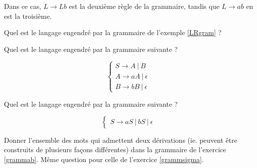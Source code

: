 Dans ce cas, $L \rightarrow Lb$ est la deuxième règle de la grammaire, tandis que $L \rightarrow ab$ en est la troisième.


\begin{exercice}
Quel est le langage engendré par la grammaire de l'exemple \ref{LRgram} ?
\end{exercice}

\begin{exercice}
\label{grammab}
Quel est le langage engendré par la grammaire suivante ?

\[
\begin{cases}
S \rightarrow A~|~B \\
A \rightarrow aA~|~\epsilon \\
B \rightarrow bB~|~\epsilon
\end{cases}
\]

\end{exercice}

\begin{exercice}
\label{grammsigma}
Quel est le langage engendré par la grammaire suivante ?

\[
\begin{cases}
S \rightarrow aS~|~bS~|~\epsilon 
\end{cases}
\]

\end{exercice}

\begin{exercice}
Donner l'ensemble des mots qui admettent deux dérivations (ie. peuvent être construits de plusieurs façons différentes) dans la grammaire de l'exercice \ref{grammab}. Même question pour celle de l'exercice \ref{grammsigma}.
\end{exercice}


